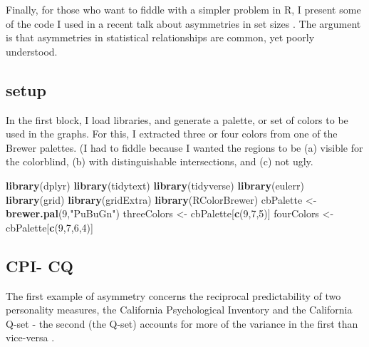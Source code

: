 \documentclass[
  openany]{book}
\newenvironment{Shaded}{\begin{snugshade}}{\end{snugshade}}
\newcommand{\DecValTok}[1]{\textcolor[rgb]{0.00,0.00,0.81}{#1}}
\newcommand{\KeywordTok}[1]{\textcolor[rgb]{0.13,0.29,0.53}{\textbf{#1}}}
\newcommand{\NormalTok}[1]{#1}
\newcommand{\StringTok}[1]{\textcolor[rgb]{0.31,0.60,0.02}{#1}}
\begin{document}
Finally, for those who want to fiddle with a simpler problem in R, I present some of the code I used in a recent talk about asymmetries in set sizes \citep{lanning2018data}. The argument is that asymmetries in statistical relationships are common, yet poorly understood.

\hypertarget{setup}{%
\subsection{setup}\label{setup}}

In the first block, I load libraries, and generate a palette, or set of colors to be used in the graphs. For this, I extracted three or four colors from one of the Brewer palettes. (I had to fiddle because I wanted the regions to be (a) visible for the colorblind, (b) with distinguishable intersections, and (c) not ugly.

\begin{Shaded}
\begin{Highlighting}[]
    \KeywordTok{library}\NormalTok{(dplyr)}
    \KeywordTok{library}\NormalTok{(tidytext)}
    \KeywordTok{library}\NormalTok{(tidyverse)}
    \KeywordTok{library}\NormalTok{(eulerr)}
    \KeywordTok{library}\NormalTok{(grid)}
    \KeywordTok{library}\NormalTok{(gridExtra)}
    \KeywordTok{library}\NormalTok{(RColorBrewer)}
\NormalTok{    cbPalette <-}\StringTok{ }\KeywordTok{brewer.pal}\NormalTok{(}\DecValTok{9}\NormalTok{,}\StringTok{"PuBuGn"}\NormalTok{)}
\NormalTok{    threeColors <-}\StringTok{ }\NormalTok{cbPalette[}\KeywordTok{c}\NormalTok{(}\DecValTok{9}\NormalTok{,}\DecValTok{7}\NormalTok{,}\DecValTok{5}\NormalTok{)]}
\NormalTok{    fourColors <-}\StringTok{ }\NormalTok{cbPalette[}\KeywordTok{c}\NormalTok{(}\DecValTok{9}\NormalTok{,}\DecValTok{7}\NormalTok{,}\DecValTok{6}\NormalTok{,}\DecValTok{4}\NormalTok{)]}
\end{Highlighting}
\end{Shaded}

\hypertarget{cpi--cq}{%
\subsection{CPI- CQ}\label{cpi--cq}}

The first example of asymmetry concerns the reciprocal predictability of two personality measures, the California Psychological Inventory and the California Q-set - the second (the Q-set) accounts for more of the variance in the first than vice-versa \citep{lanning1991shared}.
\end{document}
